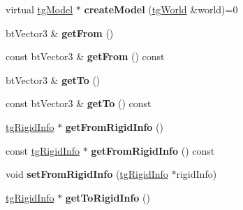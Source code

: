 \begin{DoxyCompactItemize}
\item 
\hypertarget{classtg_connector_info_ad21977f7a2577c3c4440aa7ed52e3be5}{virtual \hyperlink{classtg_model}{tg\-Model} $\ast$ {\bfseries create\-Model} (\hyperlink{classtg_world}{tg\-World} \&world)=0}\label{classtg_connector_info_ad21977f7a2577c3c4440aa7ed52e3be5}

\item 
\hypertarget{classtg_connector_info_aa65e2729137e9fbbbfbfebdc6d372b48}{bt\-Vector3 \& {\bfseries get\-From} ()}\label{classtg_connector_info_aa65e2729137e9fbbbfbfebdc6d372b48}

\item 
\hypertarget{classtg_connector_info_abab475f1c1d7fe79bceda405a61c4a19}{const bt\-Vector3 \& {\bfseries get\-From} () const }\label{classtg_connector_info_abab475f1c1d7fe79bceda405a61c4a19}

\item 
\hypertarget{classtg_connector_info_a456cd53ce4b53f5690cd61136822cef2}{bt\-Vector3 \& {\bfseries get\-To} ()}\label{classtg_connector_info_a456cd53ce4b53f5690cd61136822cef2}

\item 
\hypertarget{classtg_connector_info_aff647fffb7c06cc9656fa2ba81f760db}{const bt\-Vector3 \& {\bfseries get\-To} () const }\label{classtg_connector_info_aff647fffb7c06cc9656fa2ba81f760db}

\item 
\hypertarget{classtg_connector_info_aaf9d671e6501b1faf18539fee60ca3d9}{\hyperlink{classtg_rigid_info}{tg\-Rigid\-Info} $\ast$ {\bfseries get\-From\-Rigid\-Info} ()}\label{classtg_connector_info_aaf9d671e6501b1faf18539fee60ca3d9}

\item 
\hypertarget{classtg_connector_info_aa4d1634d99c160ffdfbb6f927cdd94cd}{const \hyperlink{classtg_rigid_info}{tg\-Rigid\-Info} $\ast$ {\bfseries get\-From\-Rigid\-Info} () const }\label{classtg_connector_info_aa4d1634d99c160ffdfbb6f927cdd94cd}

\item 
\hypertarget{classtg_connector_info_a04310aef0b90090fc541ca33523e4254}{void {\bfseries set\-From\-Rigid\-Info} (\hyperlink{classtg_rigid_info}{tg\-Rigid\-Info} $\ast$rigid\-Info)}\label{classtg_connector_info_a04310aef0b90090fc541ca33523e4254}

\item 
\hypertarget{classtg_connector_info_aef4d585bd515733b8160a0899ca2f7a5}{\hyperlink{classtg_rigid_info}{tg\-Rigid\-Info} $\ast$ {\bfseries get\-To\-Rigid\-Info} ()}\label{classtg_connector_info_aef4d585bd515733b8160a0899ca2f7a5}


\end{DoxyCompactItemize}
